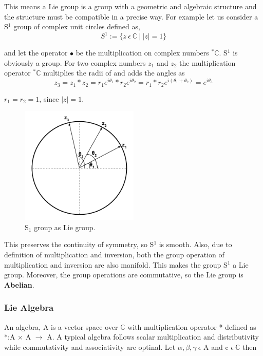 This means a Lie group is a group with a geometric and algebraic structure and the structure must be compatible in a precise way. 
For example let us consider a S$^1$ group of complex unit circles defined as,
\begin{equation}
    S^1 := \{z \: \epsilon \: \mathbb{C} \: | \: |z| = 1\}
\end{equation}

and let the operator $\bullet$ be the multiplication on complex numbers $^*\mathbb{C}$. 
S$^1$ is obviously a group. For two complex numbers $z_1$ and $z_2$ the multiplication operator $^*\mathbb{C}$ multiplies the radii of and adds the angles as
\begin{equation}
    z_3 = z_1*z_2 = r_1e^{i\theta_1} * r_2e^{i\theta_2} = r_1*r_2e^{i(\theta_1+\theta_2)} = e^{i\theta_3}
\end{equation}

$r_1 = r_2 = 1$, since $|z| = 1$.
\begin{figure}[h]
    \centering
    \includegraphics[width=0.5\textwidth]{figures/S1_Lie_group.png}
    \caption{S$_1$ group as Lie group.}
\end{figure}

This preserves the continuity of symmetry, so S$^1$ is smooth. 
Also, due to definition of multiplication and inversion, both the group operation of multiplication and inversion are also manifold.
This makes the group S$^1$ a Lie group. Moreover, the group operations are commutative, so the Lie group is \textbf{Abelian}.

\subsubsection{Lie Algebra}
An algebra, A is a vector space over $\mathbb{C}$ with multiplication operator * defined as *:A $\times$ A $\rightarrow$ A.
A typical algebra follows scalar multiplication and distributivity while commutativity and associativity are optinal.
Let $\alpha, \beta, \gamma \: \epsilon$ A and c $\epsilon \: \mathbb{C}$ then

